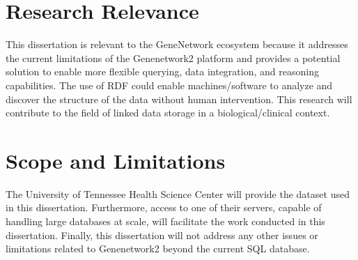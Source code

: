\section{Research Relevance}

This dissertation is relevant to the GeneNetwork ecosystem because it addresses the current limitations of the Genenetwork2 platform and provides a potential solution to enable more flexible querying, data integration, and reasoning capabilities.  The use of RDF could enable machines/software to analyze and discover the structure of the data without human intervention.  This research will contribute to the field of linked data storage in a biological/clinical context.

\section{Scope and Limitations}

The University of Tennessee Health Science Center will provide the dataset used in this dissertation.  Furthermore, access to one of their servers, capable of handling large databases at scale, will facilitate the work conducted in this dissertation.  Finally, this dissertation will not address any other issues or limitations related to Genenetwork2 beyond the current SQL database.

